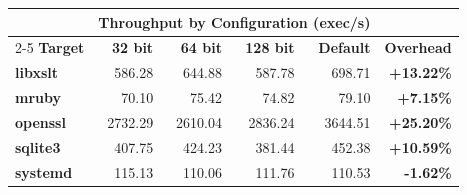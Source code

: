 \begin{table}[htbp]
\footnotesize
\centering
\begin{tabular}{lrrrrr}
\toprule
& \multicolumn{4}{c}{\textbf{Throughput by Configuration (exec/s)}} \\
\cmidrule(l){2-5}
\textbf{Target} & \textbf{32 bit} & \textbf{64 bit} & \textbf{128 bit} & \textbf{Default} & \textbf{Overhead} \\
\midrule
\textbf{libxslt} & 586.28 & 644.88 & 587.78 & 698.71 & \textbf{+13.22\%} \\ 
\textbf{mruby} & 70.10 & 75.42 & 74.82 & 79.10 & \textbf{+7.15\%} \\ 
\textbf{openssl} & 2732.29 & 2610.04 & 2836.24 & 3644.51 & \textbf{+25.20\%} \\ 
\textbf{sqlite3} & 407.75 & 424.23 & 381.44 & 452.38 & \textbf{+10.59\%} \\ 
\textbf{systemd} & 115.13 & 110.06 & 111.76 & 110.53 & \textbf{-1.62\%} \\ 
\bottomrule
\end{tabular}
\end{table}

